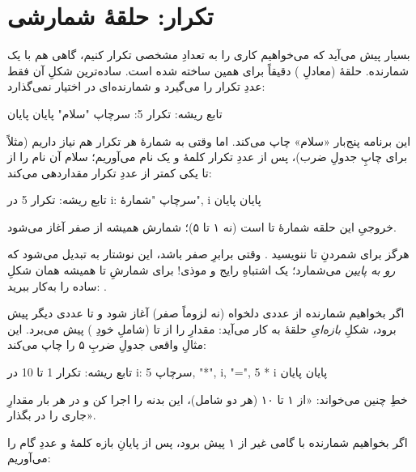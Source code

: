 \section{تکرار: حلقهٔ شمارشی}

بسیار پیش می‌آید که می‌خواهیم کاری را به تعدادِ مشخصی تکرار کنیم، گاهی هم با
یک شمارنده. حلقهٔ  (معادلِ ) دقیقاً برای همین ساخته
شده است. ساده‌ترین شکلِ آن فقط عددِ تکرار را می‌گیرد و شمارنده‌ای در اختیار
نمی‌گذارد:

\begin{salamfa}
تابع ریشه:
    تکرار 5:
        سرچاپ "سلام"
    پایان
پایان
\end{salamfa}

این برنامه پنج‌بار «سلام» چاپ می‌کند. اما وقتی به شمارهٔ هر تکرار هم نیاز
داریم (مثلاً برای چاپِ جدولِ ضرب)، پس از عددِ تکرار کلمهٔ  و یک نام
می‌آوریم؛ سلام آن نام را از  تا یکی کمتر از عددِ تکرار مقداردهی
می‌کند:

\begin{salamfa}
تابع ریشه:
    تکرار 5 در i:
        سرچاپ "شمارهٔ", i
    پایان
پایان
\end{salamfa}

خروجیِ این حلقه شمارهٔ  تا  است (نه ۱ تا ۵)؛ شمارش همیشه از
صفر آغاز می‌شود.

\begin{warn}
هرگز برای شمردنِ  تا  ننویسید .
وقتی  برابرِ صفر باشد، این نوشتار به  تبدیل می‌شود که
\emph{رو به پایین} می‌شمارد؛ یک اشتباهِ رایج و موذی! برای شمارشِ  تا
 همیشه همان شکلِ ساده را به‌کار ببرید: .
\end{warn}

اگر بخواهیم شمارنده از عددی دلخواه (نه لزوماً صفر) آغاز شود و تا عددی دیگر
پیش برود، شکلِ \emph{بازه‌ایِ} حلقهٔ  به کار می‌آید:
 مقدارِ  را از  تا  (شاملِ
خودِ ) پیش می‌برد. این مثالِ واقعی جدولِ ضربِ ۵ را چاپ می‌کند:

\begin{salamfa}
تابع ریشه:
    تکرار 1 تا 10 در i:
        سرچاپ 5, "*", i, "=", 5 * i
    پایان
پایان
\end{salamfa}

خطِ  چنین می‌خواند: «از ۱ تا ۱۰ (هر دو شامل)، این
بدنه را اجرا کن و در هر بار مقدارِ جاری را در  بگذار».

اگر بخواهیم شمارنده با گامی غیر از ۱ پیش برود، پس از پایانِ بازه کلمهٔ
 و عددِ گام را می‌آوریم:

